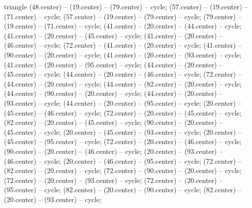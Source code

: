 \begin{pgfonlayer}{triangle}
 (48.center) -- (19.center) -- (79.center) -- cycle; 
 (57.center) -- (19.center) -- (71.center) -- cycle; 
 (57.center) -- (19.center) -- (79.center) -- cycle; 
 (79.center) -- (19.center) -- (71.center) -- cycle; 
 (41.center) -- (20.center) -- (44.center) -- cycle; 
 (41.center) -- (20.center) -- (45.center) -- cycle; 
 (41.center) -- (20.center) -- (46.center) -- cycle; 
 (72.center) -- (41.center) -- (20.center) -- cycle; 
 (41.center) -- (90.center) -- (20.center) -- cycle; 
 (41.center) -- (20.center) -- (93.center) -- cycle; 
 (41.center) -- (20.center) -- (95.center) -- cycle; 
 (44.center) -- (20.center) -- (45.center) -- cycle; 
 (44.center) -- (20.center) -- (46.center) -- cycle; 
 (72.center) -- (44.center) -- (20.center) -- cycle; 
 (44.center) -- (82.center) -- (20.center) -- cycle; 
 (44.center) -- (90.center) -- (20.center) -- cycle; 
 (44.center) -- (20.center) -- (93.center) -- cycle; 
 (44.center) -- (20.center) -- (95.center) -- cycle; 
 (20.center) -- (45.center) -- (46.center) -- cycle; 
 (72.center) -- (20.center) -- (45.center) -- cycle; 
 (82.center) -- (20.center) -- (45.center) -- cycle; 
 (90.center) -- (20.center) -- (45.center) -- cycle; 
 (20.center) -- (45.center) -- (93.center) -- cycle; 
 (20.center) -- (45.center) -- (95.center) -- cycle; 
 (72.center) -- (20.center) -- (46.center) -- cycle; 
 (90.center) -- (20.center) -- (46.center) -- cycle; 
 (20.center) -- (93.center) -- (46.center) -- cycle; 
 (20.center) -- (46.center) -- (95.center) -- cycle; 
 (72.center) -- (82.center) -- (20.center) -- cycle; 
 (72.center) -- (90.center) -- (20.center) -- cycle; 
 (72.center) -- (20.center) -- (93.center) -- cycle; 
 (72.center) -- (20.center) -- (95.center) -- cycle; 
 (82.center) -- (20.center) -- (90.center) -- cycle; 
 (82.center) -- (20.center) -- (93.center) -- cycle; 

\end{pgfonlayer}
